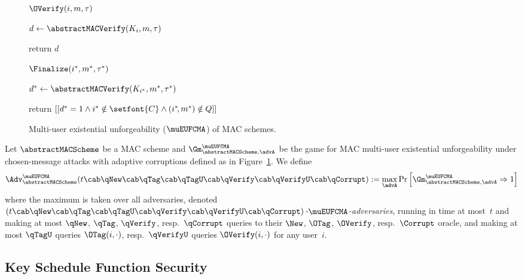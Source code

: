 \begin{figure}[t]
\begin{minipage}[t]{0.47\textwidth}
		\begin{oracle}{$\OVerify(i, m, \tau)$}
			\item $d \gets \abstractMACVerify(K_i, m, \tau)$
			\item return $d$
			\item[]
		\end{oracle}
		\ExptSepSpace
		
		\begin{oracle}{$\Finalize(i^*, m^*, \tau^*)$}
			\item $d^* \gets \abstractMACVerify(K_{i^*}, m^*, \tau^*)$
			\item return $[[ d^* = 1 \land i^* \notin \setfont{C} \land (i^*\!, m^*) \notin Q ]]$
		\end{oracle}
	\end{minipage}
	
	\caption{%
		Multi-user existential unforgeability ($\muEUFCMA$) of MAC schemes.
	}
	\label{fig:muEUFCMA}
\end{figure}

\begin{definition}
	\label{def:MAC-muEUFCMA}
	Let $\abstractMACScheme$ be a MAC scheme
	and $\Gm^{\muEUFCMA}_{\abstractMACScheme,\advA}$ be the game for MAC multi-user existential unforgeability under chosen-message attacks with adaptive corruptions defined as in Figure~\ref{fig:muEUFCMA}.
	We define
	\[
		\Adv^{\muEUFCMA}_{\abstractMACScheme}(t\cab \qNew\cab \qTag\cab\qTagU\cab \qVerify\cab \qVerifyU\cab \qCorrupt) := \max_\advA \Pr \left[ \Gm^{\muEUFCMA}_{\abstractMACScheme,\advA} \Rightarrow 1 \right]
	\]
	where the maximum is taken over all adversaries, denoted \emph{$(t\cab \qNew\cab \qTag\cab\qTagU\cab \qVerify\cab\qVerifyU\cab \qCorrupt)$-$\muEUFCMA$-adversaries}, running in time at most~$t$ and making at most $\qNew$, $\qTag$, $\qVerify$, resp.\ $\qCorrupt$ queries to their $\New$, $\OTag$, $\OVerify$, resp.\ $\Corrupt$ oracle, and making at most $\qTagU$ queries $\OTag(i, \cdot)$, resp.\ $\qVerifyU$ queries $\OVerify(i, \cdot)$ for any user~$i$.
	
\end{definition}


\iffalse
\subsection{Key Schedule Function Security}

